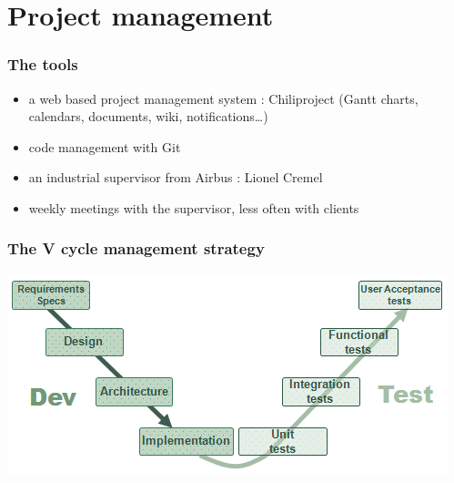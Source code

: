 \documentclass{beamer}
\begin{document}
\section{Project management}

\begin{frame}
	\frametitle{The tools}
	\begin{block}{}
    \begin{itemize}
		\item a web based project management system : Chiliproject (Gantt charts, calendars, documents, wiki, notifications\ldots )
		\item code management with Git
		\item an industrial supervisor from Airbus : Lionel Cremel
		\item weekly meetings with the supervisor, less often with clients
	\end{itemize}
	\end{block}
\end{frame}

\begin{frame}
	\frametitle{The V cycle management strategy}
	\begin{center}
		\includegraphics[width=\textwidth]{VCycle}	
	\end{center}
    
\end{frame}
\end{document}
